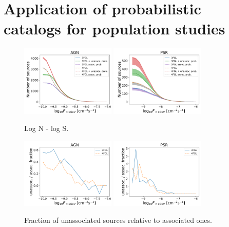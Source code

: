 \section{Application of probabilistic catalogs for population studies}



\begin{figure}[h]
\includegraphics[width=0.4\textwidth]{plots/logN_logS_AGN_unweighted.pdf}
\includegraphics[width=0.4\textwidth]{plots/logN_logS_PSR_unweighted.pdf}
\caption{Log N - log S.}  
\label{fig:logN_logS}
\end{figure}




\begin{figure}[h]
\includegraphics[width=0.4\textwidth]{plots/logN_logS_diff_AGN_unweighted.pdf}
\includegraphics[width=0.4\textwidth]{plots/logN_logS_diff_PSR_unweighted.pdf}
\caption{Fraction of unassociated sources relative to associated ones.}  
\label{fig:unass_vs_ass_frac}
\end{figure}



